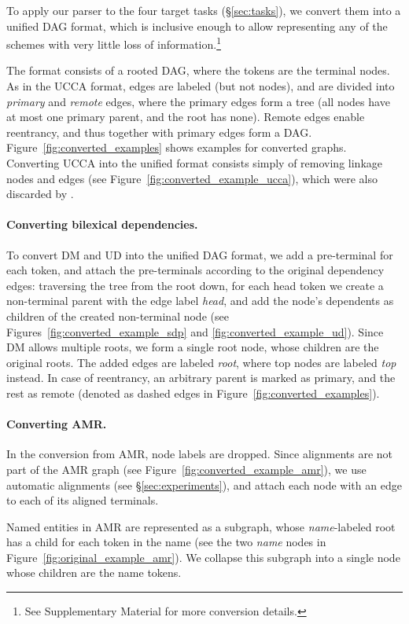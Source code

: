 \documentclass[11pt,a4paper]{article}
\begin{document}
To apply our parser to the four target tasks (\S\ref{sec:tasks}),
we convert them into a unified DAG format, which is inclusive enough to
allow representing any of the schemes with very little loss of information.\footnote{See
Supplementary Material for more conversion details.}

The format consists of a rooted DAG, where the tokens are the terminal nodes.
As in the UCCA format, edges are labeled (but not nodes),
and are divided into \textit{primary} and \textit{remote} edges,
where the primary edges form a tree (all nodes have at most one primary parent,
and the root has none).
Remote edges enable reentrancy, and thus together with primary edges
form a DAG.
Figure~\ref{fig:converted_examples} shows examples for converted graphs.
Converting UCCA into the unified format consists simply of removing linkage 
nodes and edges (see Figure~\ref{fig:converted_example_ucca}), which were
also discarded by \citet{hershcovich2017a}.

\paragraph{Converting bilexical dependencies.}
To convert DM and UD into the unified DAG format,
we add a pre-terminal for each token,
and attach the pre-terminals according to the original dependency edges:
traversing the tree from the root down, for each head token we create a non-terminal
parent with the edge label {\it head},
and add the node's dependents as children of the created non-terminal node
(see Figures~\ref{fig:converted_example_sdp} and \ref{fig:converted_example_ud}).
Since DM allows multiple roots, we form a single root node, whose children
are the original roots. The added edges are labeled \textit{root}, where
top nodes are labeled \textit{top} instead.
In case of reentrancy, an arbitrary parent is marked as primary, and the rest as remote
(denoted as dashed edges in Figure~\ref{fig:converted_examples}).

\paragraph{Converting AMR.}
In the conversion from AMR, node labels are dropped.
Since alignments are not part of the AMR graph (see Figure~\ref{fig:converted_example_amr}),
we use automatic alignments (see \S\ref{sec:experiments}),
and attach each node with an edge to each of its aligned terminals.

Named entities in AMR are represented as a subgraph, whose \textit{name}-labeled root
has a child for each token in the name (see the two \textit{name} nodes in Figure~\ref{fig:original_example_amr}).
We collapse this subgraph into a single node whose children are the name tokens.
\end{document}
